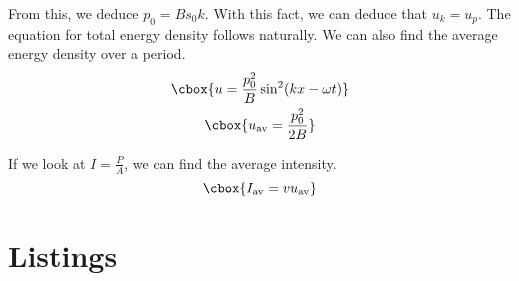 \documentclass{hw}
\numberwithin{equation}{section}
\begin{document}
From this, we deduce $p_0 = B s_0 k$. With this fact, we can deduce that $u_k =
u_p$. The equation for total energy density follows naturally. We can also find
the average energy density over a period.
\begin{gather}
  \cbox{u             = \frac{p_0^2}{B} \sin^2(kx - \omega t)} \\
  \cbox{u_{\text{av}} = \frac{p_0^2}{2B}}                     
\end{gather}

If we look at $I = \frac{P}{A}$, we can find the average intensity.
\begin{equation}
  \cbox{I_{\text{av}} = vu_{\text{av}}}
\end{equation}

\section{Listings}
\end{document}
